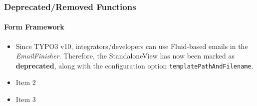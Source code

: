 %

\begin{frame}[fragile]
	\frametitle{Deprecated/Removed Functions}
	\framesubtitle{Form Framework}

	\begin{itemize}
		\item Since TYPO3 v10, integrators/developers can use Fluid-based emails
			in the \textit{EmailFinisher}. Therefore, the StandaloneView has now
			been marked as \textbf{deprecated}, along with the configuration
			option \texttt{templatePathAndFilename}.
		\item Item 2
		\item Item 3
	\end{itemize}

\end{frame}

